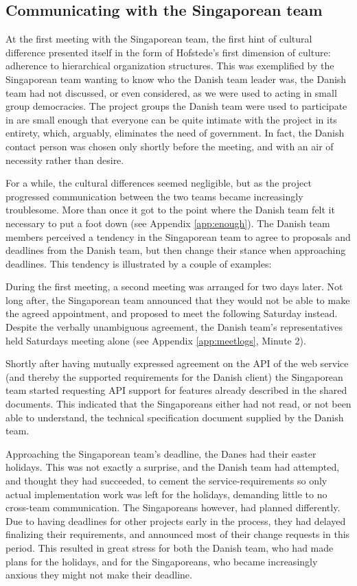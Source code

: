 \subsection{Communicating with the Singaporean team}
\label{sec:communicating}

At the first meeting with the Singaporean team, the first hint of cultural
difference presented itself in the form of Hofstede's first dimension of
culture: adherence to hierarchical organization structures\cite{surprises}.
This was exemplified by the Singaporean team wanting to know who the Danish
team leader was, the Danish team had not discussed, or even considered, as we
were used to acting in small group democracies. The project groups the Danish
team were used to participate in are small enough that everyone can be quite
intimate with the project in its entirety, which, arguably, eliminates the need
of government. In fact, the Danish contact person was chosen only shortly
before the meeting, and with an air of necessity rather than desire.

For a while, the cultural differences seemed negligible, but as the project
progressed communication between the two teams became increasingly troublesome.
More than once it got to the point where the Danish team felt it necessary to
put a foot down (see Appendix \ref{app:enough}). The Danish team members perceived a tendency
in the Singaporean team to agree to
proposals and deadlines from the Danish team, but then change their stance when
approaching deadlines. This tendency is illustrated by a couple of examples:

During the first meeting, a second meeting was arranged for two days later. Not
long after, the Singaporean team announced that they would not be able to make
the agreed appointment, and proposed to meet the following Saturday instead.
Despite the verbally unambiguous agreement, the Danish team's
representatives held Saturdays meeting alone (see Appendix \ref{app:meetlogs},
Minute 2).

Shortly after having mutually expressed
agreement on the API of the web service (and thereby the supported requirements
for the Danish client) the Singaporean team started requesting API support for
features already described in the shared documents.
This indicated that the Singaporeans either had not read, or not been able to
understand, the technical specification document supplied by the Danish team.

Approaching the Singaporean team's deadline, the Danes had their easter
holidays. This was not exactly a surprise, and the Danish team had attempted,
and thought they had succeeded, to cement the service-requirements so only
actual implementation work was left for the holidays, demanding little to no
cross-team communication. The Singaporeans however, had planned differently.
Due to having deadlines for other projects early in the process, they had
delayed finalizing their requirements, and announced most of their change
requests in this period.  This resulted in great stress for both the Danish
team, who had made plans for the holidays, and for the Singaporeans, who became
increasingly anxious they might not make their deadline.

